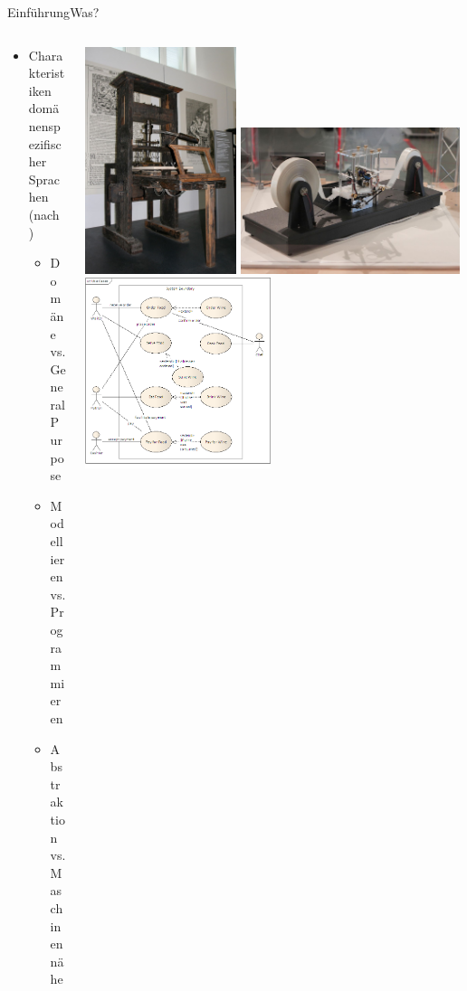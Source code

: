 \documentclass[t,aspectratio=169,divpsnames]{beamer}
\begin{document}
\begin{frame}{Einführung}{Was?}
	\begin{columns}
		\begin{column}{0.5\textwidth}
			\begin{itemize}
				\item Charakteristiken domänenspezifischer Sprachen (nach \cite[S. 30ff]{Voelter:13})
				\begin{itemize}
					\item<2-> Domäne vs. General Purpose
					\item<3-> Modellieren vs. Programmieren
					\item<4-> Abstraktion vs. Maschinennähe
				\end{itemize}
			\end{itemize}
		\end{column}
		\begin{column}{0.5\textwidth}
			\only<2>
			{
				\center
				\includegraphics[width=0.4\textwidth]{img/Druckpresse.jpg}
				\includegraphics[width=0.58\textwidth]{img/TuringMachine.jpg}
			}
			\only<3>
			{
				\center
				\includegraphics[width=0.49\textwidth]{img/UMLModel.png}
}
\end{column}
\end{columns}
\end{frame}
\end{document}
